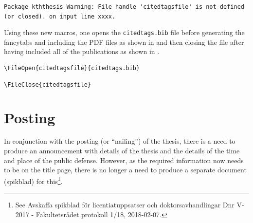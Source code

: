\documentclass[12pt, twoside]{article}
\newif\ifinswedish
\newcommand{\ReportTimeStamp}[1]{\directlua{log_event("#1")}}
\begin{document}
\begin{lstlisting}[style=latexExampleForAuthors, caption={Examples of warning when using a file that is not open}, label=lst:filewarnings]
Package kththesis Warning: File handle 'citedtagsfile' is not defined (or closed). on input line xxxx.
\end{lstlisting}

Using these new macros, one opens the \texttt{citedtags.bib} file before generating the fancytabs and including the PDF files as shown in  and then closing the file after having included all of the publications as shown in .

\begin{lstlisting}[style=latexExampleForAuthors, caption={Opening a file}, label=lst:filewOpening]
\FileOpen{citedtagsfile}{citedtags.bib}
\end{lstlisting}


\begin{lstlisting}[style=latexExampleForAuthors, caption={Closing a file}, label=lst:filewOClosing]
\FileClose{citedtagsfile}
\end{lstlisting}


\section{Posting}
\label{sec:cycle3Spik}

In conjunction with the posting (or \enquote{nailing}) of the thesis, there is a need to produce an announcement with details of the thesis and the details of the time and place of the public defense. However, as the required information now needs to be on the title page, there is no longer a need to produce a separate document (\foreignlanguage{swedish}{spikblad}) for this\footnote{See \foreignlanguage{swedish}{Avskaffa spikblad för licentiatuppsatser och doktorsavhandlingar
 Dnr V-2017 - Fakultetsrådet protokoll} 1/18, 2018-02-07.}.
 

\cleardoublepage
\ifinswedish
\printglossary[style=mylong, type=\acronymtype, title={Lista över akronymer
och förkortningar}]
\else
\printnoidxglossary[type=\acronymtype, style=mylong, title={List of Acronyms and Abbreviations}]
\fi
\cleardoublepage


\renewcommand{\bibname}{References}


\printbibliography[heading=bibintoc, title={References}]

\ReportTimeStamp{Ending of Document}
\end{document}
